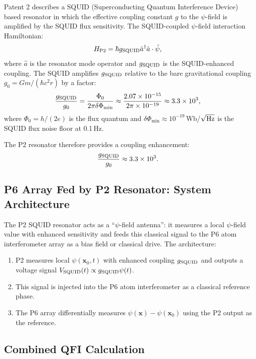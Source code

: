 \documentclass[11pt]{article}
\theoremstyle{definition}
\theoremstyle{remark}
\begin{document}
Patent 2 describes a SQUID (Superconducting Quantum Interference Device)
based resonator in which the effective coupling constant $g$ to the $\psi$-field
is amplified by the SQUID flux sensitivity. The SQUID-coupled $\psi$-field
interaction Hamiltonian:
\begin{equation}
H_{\rm P2} = \hbar g_{\rm SQUID} \hat{a}^\dagger \hat{a} \cdot \hat{\psi},
\end{equation}
where $\hat{a}$ is the resonator mode operator and $g_{\rm SQUID}$ is the
SQUID-enhanced coupling. The SQUID amplifies $g_{\rm SQUID}$ relative to the
bare gravitational coupling $g_0 = Gm/(\hbar c^2 r)$ by a factor:
\begin{equation}
\frac{g_{\rm SQUID}}{g_0} = \frac{\Phi_0}{2\pi \delta\Phi_{\min}}
\approx \frac{2.07\times10^{-15}}{2\pi \times 10^{-19}}
\approx 3.3\times10^3,
\end{equation}
where $\Phi_0 = h/(2e)$ is the flux quantum and $\delta\Phi_{\min}
\approx 10^{-19}$\,Wb/$\sqrt{\rm Hz}$ is the SQUID flux noise floor at 0.1\,Hz.

The P2 resonator therefore provides a coupling enhancement:
\begin{equation}
\frac{g_{\rm SQUID}}{g_0} \approx 3.3\times10^3.
\label{eq:squid-gain}
\end{equation}

\subsection{P6 Array Fed by P2 Resonator: System Architecture}

The P2 SQUID resonator acts as a ``$\psi$-field antenna'': it measures
a local $\psi$-field value with enhanced sensitivity and feeds this
classical signal to the P6 atom interferometer array as a bias field
or classical drive. The architecture:
\begin{enumerate}
\item P2 measures local $\psi(\mathbf{x}_0, t)$ with enhanced coupling
  $g_{\rm SQUID}$ and outputs a voltage signal $V_{\rm SQUID}(t) \propto
  g_{\rm SQUID} \psi(t)$.
\item This signal is injected into the P6 atom interferometer as a classical
  reference phase.
\item The P6 array differentially measures $\psi(\mathbf{x}) - \psi(\mathbf{x}_0)$
  using the P2 output as the reference.
\end{enumerate}

\subsection{Combined QFI Calculation}
\end{document}
